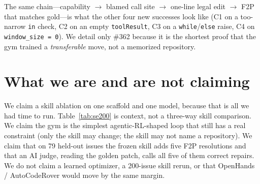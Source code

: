 \documentclass[11pt,a4paper]{article}
\begin{document}
The same chain---capability $\rightarrow$ blamed call site
$\rightarrow$ one-line legal edit $\rightarrow$ F2P that matches
gold---is what the other four new successes look like (C1 on a
too-narrow \texttt{in} check, C2 on an empty \texttt{toolResult},
C3 on a \texttt{while}/\texttt{else} raise, C4 on
\texttt{window\_size = 0}). We detail only \#362 because it is
the shortest proof that the gym trained a \emph{transferable}
move, not a memorized repository.

\section{What we are and are not claiming}
\label{sec:limit}

We claim a skill ablation on one scaffold and one model, because
that is all we had time to run. Table~\ref{tab:se200} is context,
not a three-way skill comparison. We claim the gym is the
simplest agentic-RL-shaped loop that still has a real constraint
(only the skill may change; the skill may not name a repository).
We claim that on 79 held-out issues the frozen skill adds five
F2P resolutions and that an AI judge, reading the golden patch,
calls all five of them correct repairs. We do not claim a learned
optimizer, a 200-issue skill rerun, or that OpenHands /
AutoCodeRover would move by the same margin.
\end{document}
